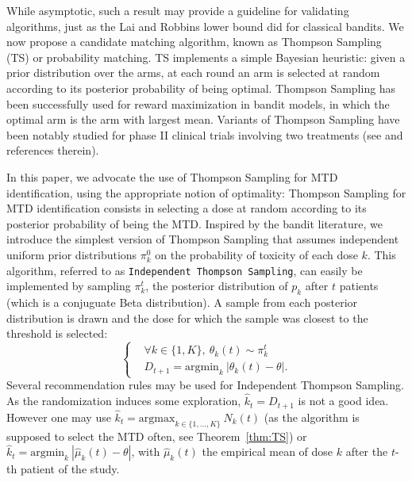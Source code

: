 While asymptotic, such a result may provide a guideline for validating algorithms, just as the Lai and Robbins lower bound did for classical bandits. We now propose a candidate matching algorithm, known as Thompson Sampling (TS) \cite{Thompson33} or probability matching. TS implements a simple Bayesian heuristic: given a prior distribution over the arms, at each round an arm is selected at random according to its posterior probability of being optimal. Thompson Sampling has been successfully used for reward maximization in bandit models, in which the optimal arm is the arm with largest mean. Variants of Thompson Sampling have been notably studied for phase II clinical trials involving two treatments (see \cite{Thall07} and references therein). 

In this paper, we advocate the use of Thompson Sampling for MTD identification, using the appropriate notion of optimality: Thompson Sampling for MTD identification consists in selecting a dose at random according to its posterior probability of being the MTD. Inspired by the bandit literature, we introduce the simplest version of Thompson Sampling that assumes independent uniform prior distributions $\pi_k^0$ on the probability of toxicity of each dose $k$. This algorithm, referred to as \texttt{Independent Thompson Sampling}, can easily be implemented by sampling $\pi_k^t$, the posterior distribution of $p_k$ after $t$ patients (which is a conjuguate Beta distribution). A sample from each posterior distribution is drawn and the dose for which the sample was closest to the threshold is selected: 
\[\left\{\begin{array}{cl}
& \forall k \in \{1,K\}, \  \theta_k(t) \sim \pi_k^t \\
& D_{t+1} = \text{argmin}_{k} \ |\theta_k(t) - \theta|.
\end{array}\right.\]
Several recommendation rules may be used for Independent Thompson Sampling. As the randomization induces some exploration, $\hat{k}_t = D_{t+1}$ is not a good idea. However one may use $\hat{k}_t= \text{argmax}_{k \in \{1,\dots,K\}} \ N_k(t)$ (as the algorithm is supposed to select the MTD often, see Theorem~\ref{thm:TS}) or $\hat{k}_t= \text{argmin}_{k} \ |\hat{\mu}_k(t) - \theta|$, with $\hat{\mu}_k(t)$ the empirical mean of dose $k$ after the $t$-th patient of the study. 



